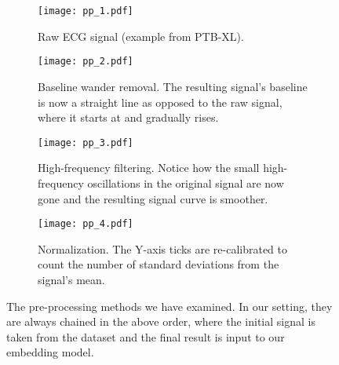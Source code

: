 \documentclass[preprint,12pt]{elsarticle}
\begin{document}
\begin{figure}[h]
    \centering
    \begin{subfigure}[b]{0.45\textwidth}
    \centering
    \texttt{[image: pp\_1.pdf]}
    \caption{Raw ECG signal (example from PTB-XL).}
    \vspace{2.1em}
    \label{fig:pp1}
    \end{subfigure}
    \hfill
    \begin{subfigure}[b]{0.45\textwidth}
    \centering
    \texttt{[image: pp\_2.pdf]}
    \caption{Baseline wander removal. The resulting signal's baseline is now a straight line  as opposed to the raw signal, where it starts at  and gradually rises. }
    \label{fig:pp2}
    \end{subfigure}    
    \begin{subfigure}[b]{0.45\textwidth}
    \centering
    \texttt{[image: pp\_3.pdf]}
    \caption{High-frequency filtering. Notice how the small high-frequency oscillations in the original signal are now gone and the resulting signal curve is smoother. }
    \label{fig:pp3}
    \end{subfigure}
    \hfill
    \begin{subfigure}[b]{0.45\textwidth}
    \centering
    \texttt{[image: pp\_4.pdf]}
    \caption{Normalization. The Y-axis ticks are re-calibrated to count the number of standard deviations from the signal's mean.}
    \vspace{0.9em}
    \label{fig:pp4}
    \end{subfigure}
    \caption{The pre-processing methods we have examined. In our setting, they are always chained in the above order, where the initial signal is taken from the dataset and the final result is input to our embedding model.}
    \label{fig:preprocessing}
\end{figure}
\end{document}
